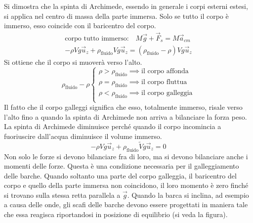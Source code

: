 \documentclass[10pt,a4paper]{book}
\begin{document}
Si dimostra che la spinta di Archimede, essendo in generale i corpi esterni estesi, si applica nel centro di massa della parte immersa. Solo se tutto il corpo è immerso, esso coincide con il baricentro del corpo.
\begin{gather*}
	\text{corpo tutto immerso:} \quad M\vec{g} +\vec{F}_s = M\vec{a}_{cm} \\
	-\rho Vg\vec{u}_z + \rho_{\text{fluido} }Vg\vec{u}_z = (\rho_{\text{fluido} }- \rho)Vg\vec{u}_z
\end{gather*}
Si ottiene che il corpo si muoverà verso l'alto.
\[
	\rho_{\text{fluido} }-\rho \left\{ \begin{array}{l}
	 	\rho > \rho_{\text{fluido}} \implies \text{il corpo affonda} \\
	 	\rho = \rho_{\text{fluido}} \implies \text{il corpo fluttua} \\
	 	\rho < \rho_{\text{fluido}} \implies \text{il corpo galleggia} \\
	\end{array} \right.
\]
Il fatto che il corpo galleggi significa che esso, totalmente immerso, risale verso l'alto fino a quando la spinta di Archimede non arriva a bilanciare la forza peso. La spinta di Archimede diminuisce perché quando il corpo incomincia a fuoriuscire dall'acqua diminuisce il volume immerso.
\[
	-\rho Vg\vec{u}_z + \rho_{\text{fluido} }\widetilde{V}g\vec{u}_z=0
\]
Non solo le forze si devono bilanciare fra di loro, ma si devono bilanciare anche i momenti delle forze. Questa è una condizione necessaria per il galleggiamento delle barche. Quando soltanto una parte del corpo galleggia, il baricentro del corpo e quello della parte immersa non coincidono, il loro momento è zero finché si trovano sulla stessa retta parallela a $\vec{g}$.
Quando la barca si inclina, ad esempio a causa delle onde, gli scafi delle barche devono essere progettati in maniera tale che essa reagisca riportandosi in posizione di equilibrio (si veda la figura).
\end{document}
